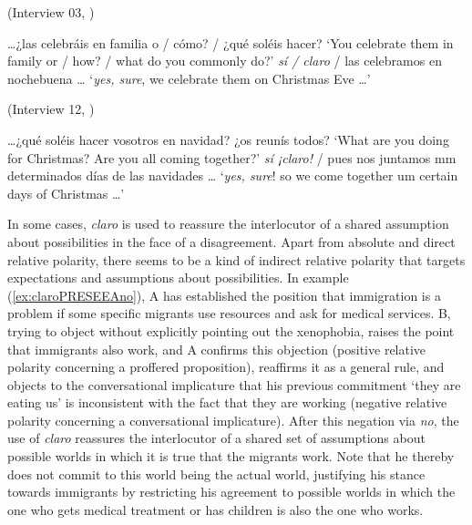 \begin{exe}
\ex \label{ex:claroPRESEEAsoleishacer} (Interview 03, \citealt{PRESEEA.20142020}) 
	\begin{xlist}[A:]
	\ldots ¿las celebráis en familia o / cómo? / ¿qué soléis hacer? 
	\glt `You celebrate them in family or / how? / what do you commonly do?' 
	\textit{sí / claro} / las celebramos en nochebuena \ldots 
	\glt `\textit{yes, sure}, we celebrate them on Christmas Eve \ldots' 
	\end{xlist}

\ex \label{ex:claroPRESEEAreunis} (Interview 12, \citealt{PRESEEA.20142020}) 
	\begin{xlist}[A:]
	\ldots ¿qué soléis hacer vosotros en navidad? ¿os reunís todos? 
	\glt `What are you doing for Christmas? Are you all coming together?'
	\textit{sí ¡claro!} / pues nos juntamos mm determinados días de las navidades \ldots 
	\glt `\textit{yes, sure}! so we come together um certain days of Christmas \ldots' 
	\end{xlist}
\end{exe}


In some cases, \textit{claro} is used to reassure the interlocutor of a shared assumption about possibilities in the face of a disagreement. Apart from absolute and direct relative polarity, there seems to be a kind of indirect relative polarity that targets expectations and assumptions about possibilities. In example (\ref{ex:claroPRESEEAno}), A has established the position that immigration is a problem if some specific migrants use resources and ask for medical services. B, trying to object without explicitly pointing out the xenophobia, raises the point that immigrants also work, and A confirms this objection (positive relative polarity concerning a proffered proposition), reaffirms it as a general rule, and objects to the conversational implicature that his previous commitment `they are eating us' is inconsistent with the fact that they are working (negative relative polarity concerning a conversational implicature). After this negation via \textit{no}, the use of \textit{claro} reassures the interlocutor of a shared set of assumptions about possible worlds in which it is true that the migrants work. Note that he thereby does not commit to this world being the actual world, justifying his stance towards immigrants by restricting his agreement to possible worlds in which the one who gets medical treatment or has children is also the one who works.

